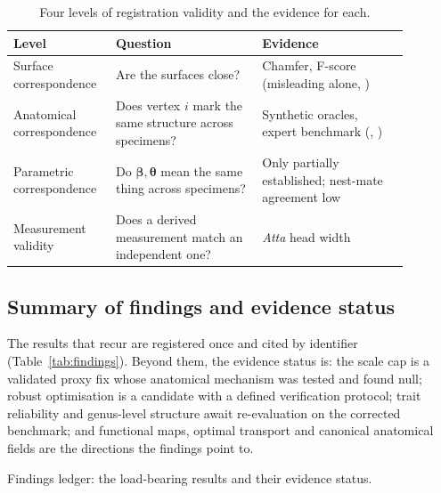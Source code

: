 \begin{table}[!htb]
\centering
\caption{Four levels of registration validity and the evidence for each.}
\label{tab:validity}
\begin{tabular}{@{}L{0.20\linewidth}L{0.34\linewidth}L{0.34\linewidth}@{}}
\toprule
\textbf{Level} & \textbf{Question} & \textbf{Evidence}\\
\midrule
Surface correspondence & Are the surfaces close? & Chamfer, F-score
 (misleading alone, )\\
Anatomical correspondence & Does vertex $i$ mark the same structure across
 specimens? & Synthetic oracles, expert benchmark (, )\\
Parametric correspondence & Do $\bm\beta,\bm\theta$ mean the same thing across
 specimens? & Only partially established; nest-mate agreement low\\
Measurement validity & Does a derived measurement match an independent one? &
 \emph{Atta} head width\\
\bottomrule
\end{tabular}
\end{table}

\subsection{Summary of findings and evidence status}
\label{sec:ledger}

The results that recur are registered once and cited by identifier
(Table~\ref{tab:findings}). Beyond them, the evidence status is: the scale cap is a validated
proxy fix whose anatomical mechanism was tested and found null; robust
optimisation is a candidate with a defined verification protocol; trait
reliability and genus-level structure await re-evaluation on the corrected
benchmark; and functional maps, optimal transport and canonical anatomical
fields are the directions the findings point to.

\begin{table}[!htb]
\centering
\caption{Findings ledger: the load-bearing results and their evidence status.}
\label{tab:findings}
\printfindingledger
\end{table}
